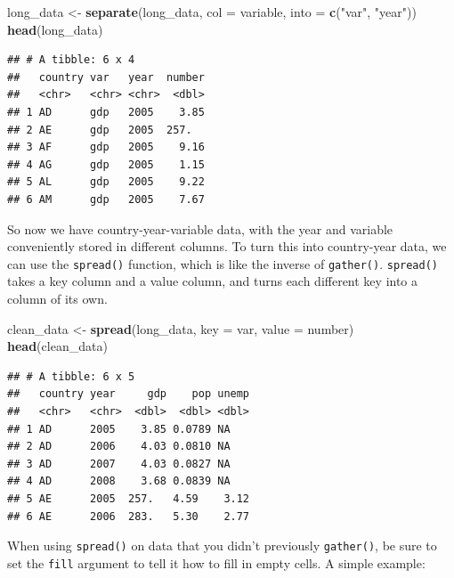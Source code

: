 \documentclass[
  12pt,
  oneside,openany]{book}
\newenvironment{Shaded}{\begin{snugshade}}{\end{snugshade}}
\newcommand{\DataTypeTok}[1]{\textcolor[rgb]{0.13,0.29,0.53}{#1}}
\newcommand{\KeywordTok}[1]{\textcolor[rgb]{0.13,0.29,0.53}{\textbf{#1}}}
\newcommand{\NormalTok}[1]{#1}
\newcommand{\StringTok}[1]{\textcolor[rgb]{0.31,0.60,0.02}{#1}}
\begin{document}
\begin{Shaded}
\begin{Highlighting}[]
\NormalTok{long\_data \textless{}{-}}\StringTok{ }\KeywordTok{separate}\NormalTok{(long\_data,}
                      \DataTypeTok{col =}\NormalTok{ variable,}
                      \DataTypeTok{into =} \KeywordTok{c}\NormalTok{(}\StringTok{"var"}\NormalTok{, }\StringTok{"year"}\NormalTok{))}
\KeywordTok{head}\NormalTok{(long\_data)}
\end{Highlighting}
\end{Shaded}

\begin{verbatim}
## # A tibble: 6 x 4
##   country var   year  number
##   <chr>   <chr> <chr>  <dbl>
## 1 AD      gdp   2005    3.85
## 2 AE      gdp   2005  257.  
## 3 AF      gdp   2005    9.16
## 4 AG      gdp   2005    1.15
## 5 AL      gdp   2005    9.22
## 6 AM      gdp   2005    7.67
\end{verbatim}

So now we have country-year-variable data, with the year and variable conveniently stored in different columns. To turn this into country-year data, we can use the \texttt{spread()} function, which is like the inverse of \texttt{gather()}. \texttt{spread()} takes a key column and a value column, and turns each different key into a column of its own.

\begin{Shaded}
\begin{Highlighting}[]
\NormalTok{clean\_data \textless{}{-}}\StringTok{ }\KeywordTok{spread}\NormalTok{(long\_data,}
                     \DataTypeTok{key =}\NormalTok{ var,}
                     \DataTypeTok{value =}\NormalTok{ number)}
\KeywordTok{head}\NormalTok{(clean\_data)}
\end{Highlighting}
\end{Shaded}

\begin{verbatim}
## # A tibble: 6 x 5
##   country year     gdp    pop unemp
##   <chr>   <chr>  <dbl>  <dbl> <dbl>
## 1 AD      2005    3.85 0.0789 NA   
## 2 AD      2006    4.03 0.0810 NA   
## 3 AD      2007    4.03 0.0827 NA   
## 4 AD      2008    3.68 0.0839 NA   
## 5 AE      2005  257.   4.59    3.12
## 6 AE      2006  283.   5.30    2.77
\end{verbatim}

When using \texttt{spread()} on data that you didn't previously \texttt{gather()}, be sure to set the \texttt{fill} argument to tell it how to fill in empty cells. A simple example:
\end{document}

